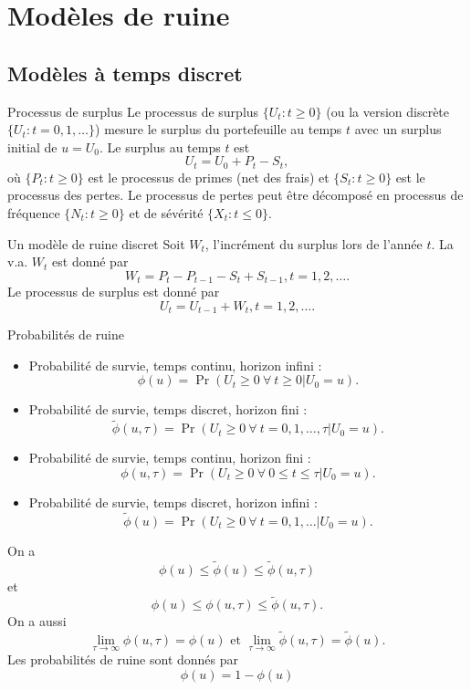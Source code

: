 \chapter{Modèles de ruine}

\section{Modèles à temps discret}

\begin{definition}{Processus de surplus}{}
	Le processus de surplus $\{U_t : t \geq 0\}$ (ou la version discrète $\{U_t : t = 0, 1, \dots\}$) mesure le surplus du portefeuille au temps $t$ avec un surplus initial de $u = U_0$. Le surplus au temps $t$ est 
	$$U_t = U_0 + P_t - S_t,$$
	où $\{P_t : t \geq 0\}$ est le processus de primes (net des frais) et $\{S_t : t \geq 0\}$ est le processus des pertes. Le processus de pertes peut être décomposé en processus de fréquence $\{N_t : t \geq 0\}$ et de sévérité $\{X_t : t\leq 0\}$.
\end{definition}

\begin{definition}{Un modèle de ruine discret}{}
	Soit $W_t$, l'incrément du surplus lors de l'année $t$. La v.a. $W_t$ est donné par
	$$W_t = P_t - P_{t-1} - S_t + S_{t-1}, t = 1, 2, \dots .$$
	Le processus de surplus est donné par 
	$$U_t = U_{t-1} + W_t, t = 1, 2, \dots .$$
\end{definition}

\begin{definition}{Probabilités de ruine}{}
	\begin{itemize}
		\item Probabilité de survie, temps continu, horizon infini : 
		$$\phi(u) = \Pr(U_t \geq 0 ~\forall~ t\geq 0 \vert U_0 = u).$$
		\item Probabilité de survie, temps discret, horizon fini : 
		$$\tilde{\phi}(u, \tau) = \Pr(U_t \geq 0 ~\forall~ t = 0, 1, \dots, \tau \vert U_0 = u).$$
		\item Probabilité de survie, temps continu, horizon fini : 
		$$\phi(u, \tau) = \Pr(U_t \geq 0 ~\forall~ 0\leq t \leq \tau \vert U_0 = u).$$
		\item Probabilité de survie, temps discret, horizon infini : 
		$$\tilde{\phi}(u) = \Pr(U_t \geq 0 ~\forall~ t = 0, 1, \dots \vert U_0 = u).$$
	\end{itemize}
	On a 
	$$\phi(u) \leq \tilde{\phi}(u) \leq \tilde{\phi}(u, \tau)$$
	et
	$$\phi(u) \leq \phi(u, \tau) \leq \tilde{\phi}(u, \tau).$$
	On a aussi
	$$\lim\limits_{\tau \to \infty} \phi(u, \tau) = \phi(u) \text{ et } \lim\limits_{\tau \to \infty} \tilde{\phi}(u, \tau) = \tilde{\phi}(u).$$
	Les probabilités de ruine sont donnés par $$\phi(u) = 1 - \phi(u)$$
\end{definition}

